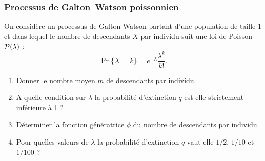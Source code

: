 \subsubsection{Processus de Galton–Watson poissonnien} %
  On considère un processus de Galton-Watson partant d'une population de taille 1 et dans lequel le nombre de descendants $X$ par individu suit une loi de Poisson $\mathcal{P}(\lambda)$ :
  $$
  \Pr\{X = k\} = e^{-\lambda} \frac{\lambda^k}{k!}.
  $$
  \begin{enumerate}
    \item Donner le nombre moyen $m$ de descendants par individu.
    \item A quelle condition sur $\lambda$ la probabilité d'extinction $q$ est-elle strictement inférieure à 1 ?
    \item Déterminer la fonction génératrice $\phi$ du nombre de descendants par individu.
    \item Pour quelles valeurs de $\lambda$ la probabilité d'extinction $q$ vaut-elle $1/2$,  $1/10$ et $1/100$ ?
  \end{enumerate}
